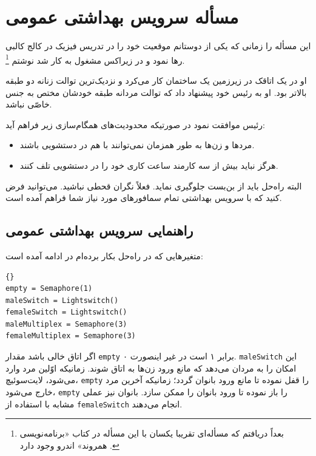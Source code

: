 \documentclass{book}
\newcommand{\clearemptydoublepage}{\newpage\cleardoublepage}
\begin{document}

\section{مسأله سرویس بهداشتی عمومی}

    این مسأله را زمانی که یکی از دوستانم موقعیت خود را در تدریس فیزیک در کالج کالبی رها نمود 
    و در زیراکس مشغول به کار شد نوشتم%
    \footnote{بعداً دریافتم که مسأله‌ای تقریبا یکسان با این مسأله در کتاب «برنامه‌نویسی همروند» اندرو وجود دارد \cite{andrews}.}. 

    او  در یک اتاقک در زیرزمین یک ساختمان کار می‌کرد و نزدیک‌ترین توالت زنانه دو طبقه بالاتر بود.
    او به رئیس خود پیشنهاد داد که توالت مردانه طبقه خودشان مختص به جنس خاصّی نباشد. 

    رئیس موافقت نمود در صورتیکه محدودیت‌های همگام‌سازی زیر فراهم آید: 

\begin {itemize}

\item
    مردها و زن‌ها به طور همزمان نمی‌توانند با هم در دستشویی باشند. 

\item
    هرگز نباید بیش از سه کارمند ساعت کاری خود را در دستشویی تلف کنند. 
\end{itemize}

    البته راه‌حل باید از بن‌بست جلوگیری نماید. فعلاً نگران قحطی نباشید. می‌توانید فرض کنید که با سرویس بهداشتی تمام سمافورهای 
    مورد نیاز شما فراهم آمده است. 


\clearemptydoublepage
\subsection{راهنمایی سرویس بهداشتی عمومی}

    متغیرهایی که در راه‌حل بکار برده‌ام در ادامه آمده است:

\begin{latin}
\begin{lstlisting}[title=\rl{راهنمایی سرویس بهداشتی عمومی}]{}
empty = Semaphore(1)
maleSwitch = Lightswitch()
femaleSwitch = Lightswitch()
maleMultiplex = Semaphore(3)
femaleMultiplex = Semaphore(3)
\end{lstlisting}
\end{latin}

     اگر اتاق خالی باشد مقدار {\tt empty} برابر ۱ است در غیر اینصورت ۰. 
    {\tt maleSwitch} 
    این امکان را به مردان می‌دهد که مانع ورود زن‌ها به اتاق شوند. زمانیکه اوّلین مرد وارد می‌شود، لایت‌سوئیچ، {\tt empty} را قفل نموده تا 
    مانع ورود بانوان گردد؛ زمانیکه آخرین مرد خارج می‌شود، {\tt empty} را باز نموده تا ورود بانوان را ممکن سازد. بانوان نیز 
    عملی مشابه با استفاده از {\tt femaleSwitch} انجام می‌دهند.
\end{document}
